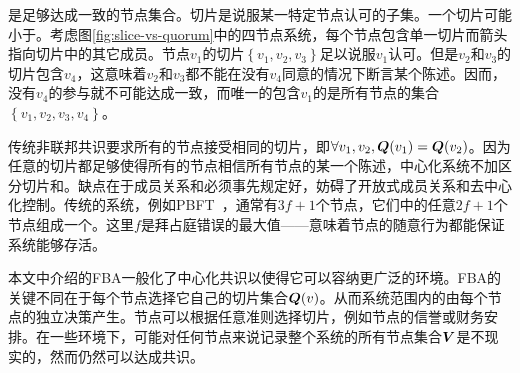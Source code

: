 {\quorum}是足够达成一致的节点集合。切片是说服某一特定节点认可的{\quorum}子集。一个{\quorum}切片可能小于{\quorum}。考虑图\ref{fig:slice-vs-quorum}中的四节点系统，每个节点包含单一切片而箭头指向切片中的其它成员。节点$v_1$的切片$\left\{v_1,v_2,v_3\right\}$足以说服$v_1$认可。但是$v_2$和$v_3$的切片包含$v_4$，这意味着$v_2$和$v_3$都不能在没有$v_4$同意的情况下断言某个陈述。因而，没有$v_4$的参与就不可能达成一致，而唯一的包含$v_1$的{\quorum}是所有节点的集合$\left\{v_1,v_2,v_3,v_4\right\}$。

传统非联邦共识要求所有的节点接受相同的切片，即$\forall v_1, v_2, {\bm Q}(v_1)={\bm Q}(v_2)$。因为任意的切片都足够使得所有的节点相信所有节点的某一个陈述，中心化系统不加区分切片和{\quorum}。缺点在于成员关系和{\quorum}必须事先规定好，妨碍了开放式成员关系和去中心化控制。传统的系统，例如PBFT~\cite{Castro:1999:PBFT}，通常有$3f+1$个节点，它们中的任意$2f+1$个节点组成一个{\quorum}。这里$f$是拜占庭错误的最大值——意味着节点的随意行为都能保证系统能够存活。

本文中介绍的FBA一般化了中心化共识以使得它可以容纳更广泛的环境。FBA的关键不同在于每个节点选择它自己的{\quorum}切片集合${\bm Q}(v)$。从而系统范围内的{\quorum}由每个节点的独立决策产生。节点可以根据任意准则选择切片，例如节点的信誉或财务安排。在一些环境下，可能对任何节点来说记录整个系统的所有节点集合${{\bm V}}$是不现实的，然而仍然可以达成共识。